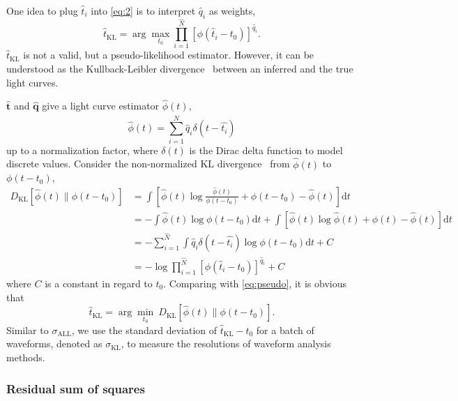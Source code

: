 One idea to plug $\hat{t}_i$ into \eqref{eq:2} is to interpret $\hat{q}_i$ as weights,
\begin{equation}
  \label{eq:pseudo}
  \hat{t}_\mathrm{KL} = \arg\underset{t_0}{\max} \prod_{i=1}^{\hat{N}} \left[\phi(\hat{t}_i-t_0)\right]^{\hat{q}_i}.
\end{equation}
$\hat{t}_\mathrm{KL}$ is not a valid, but a pseudo-likelihood estimator. However, it can be understood as the Kullback-Leibler divergence~\cite{kullback_information_1951} between an inferred and the true light curves.

$\bm{\hat{t}}$ and $\bm{\hat{q}}$ give a light curve estimator $\hat{\phi}(t)$,
\begin{equation}
  \label{eq:lc}
  \hat{\phi}(t) = \sum_{i=1}^{\hat{N}} \hat{q}_i\delta(t-\hat{t_i})
\end{equation}
up to a normalization factor, where $\delta(t)$ is the Dirac delta function to model discrete values.  Consider the non-normalized KL divergence~\cite{mihoko_robust_2002} from $\hat{\phi}(t)$ to $\phi(t-t_{0})$,
\begin{equation}
  \begin{aligned}
    D_\mathrm{KL}\left[\hat{\phi}(t) \parallel \phi(t-t_0)\right] & =\int \left[\hat{\phi}(t) \log\frac{\hat{\phi}(t)}{\phi(t-t_0)} + \phi(t-t_0) - \hat{\phi}(t) \right]\mathrm{d}t \\
    & = - \int \hat{\phi}(t) \log\phi(t-t_0)\mathrm{d}t + \int \left[\hat{\phi}(t) \log\hat{\phi}(t) + \phi(t) - \hat{\phi}(t) \right]\mathrm{d}t \\
    & = - \sum_{i=1}^{\hat{N}}\int \hat{q}_i\delta(t-\hat{t_i}) \log\phi(t-t_0)\mathrm{d}t + C \\
    & = -\log \prod_{i=1}^{\hat{N}} \left[\phi(\hat{t}_i-t_0)\right]^{\hat{q}_i} + C
  \label{eq:kl}
  \end{aligned}
\end{equation}
where $C$ is a constant in regard to $t_0$.  Comparing with \eqref{eq:pseudo}, it is obvious that
\begin{equation}
  \label{eq:kl2}
  \hat{t}_\mathrm{KL} = \arg\underset{t_0}{\min}~D_\mathrm{KL}\left[\hat{\phi}(t) \parallel \phi(t-t_0)\right].
\end{equation}
Similar to $\sigma_\mathrm{ALL}$, we use the standard deviation of $\hat{t}_\mathrm{KL} - t_0$ for a 
batch of waveforms, denoted as $\sigma_\mathrm{KL}$, to measure the resolutions of waveform analysis methods.

\subsubsection{Residual sum of squares}
\label{sec:rss}

